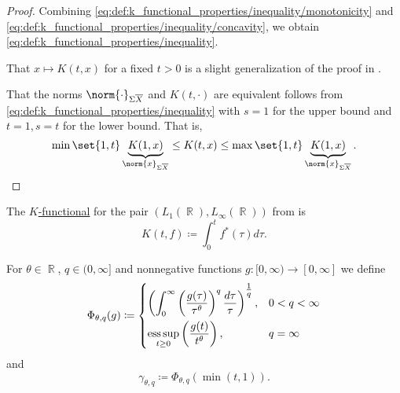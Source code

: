 \begin{proof}
  Combining \eqref{eq:def:k_functional_properties/inequality/monotonicity} and \eqref{eq:def:k_functional_properties/inequality/concavity}, we obtain \eqref{eq:def:k_functional_properties/inequality}.

   That \( x \mapsto K(t, x) \) for a fixed \( t > 0 \) is a slight generalization of the proof in .

  That the norms \( \norm{\cdot}_{\Sigma \overline{X}} \) and \( K(t, \cdot) \) are equivalent follows from \eqref{eq:def:k_functional_properties/inequality} with \( s = 1 \) for the upper bound and \( t = 1, s = t \) for the lower bound. That is,
  \begin{equation*}
    \min\set{1, t} \underbrace{K(1, x)}_{\norm{x}_{\Sigma \overline{X}}} \leq K(t, x) \leq \max\set{1, t} \underbrace{K(1, x)}_{\norm{x}_{\Sigma \overline{X}}}.
  \end{equation*}
\end{proof}

\begin{example}\label{thm:lp_interpolation_spaces/k_functional}
  The \hyperref[def:k_functional]{\( K \)-functional} for the pair \( (L_1(\BbbR), L_\infty(\BbbR)) \) from  is
  \begin{equation*}
    K(t, f) \coloneqq \int_0^t f^*(\tau) d\tau.
  \end{equation*}
\end{example}

\begin{definition}\label{def:lorenz_quasinorm}
  For \( \theta \in \BbbR \), \( q \in (0, \infty] \) and nonnegative functions \( g: [0, \infty) \to [0, \infty] \) we define
  \begin{equation}\label{eq:def:lorenz_quasinorm}
    \Phi_{\theta,q}(g) \coloneqq \begin{dcases}
      \left( \int_0^\infty \left( \frac {g(\tau)} {\tau^\theta} \right)^q \frac {d\tau} \tau \right)^{\tfrac 1 q}, &0 < q < \infty \\
      \operatorname*{ess\sup}_{t \geq 0} \left( \frac {g(t)} {t^\theta} \right),                                                &q = \infty
    \end{dcases}
  \end{equation}
  and
  \begin{equation}\label{eq:def:lorenz_quasinorm/gamma}
    \gamma_{\theta,q} \coloneqq \Phi_{\theta,q}(\min(t, 1)).
  \end{equation}
\end{definition}

